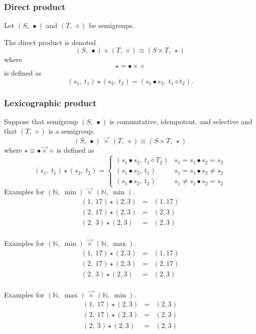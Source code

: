 \documentclass[10pt]{article}
\newcommand{\NN}{\mathbb{N}}
\newcommand{\lexprod}{\ensuremath{\mathbin{\vec{\times}}}}
\begin{document}
\subsubsection{Direct product} 

Let $(S,\ \bullet)$ and $(T,\ \diamond)$ be semigroups.

The {direct product} is denoted 
\[ 
   (S,\ \bullet) \times (T,\ \diamond) \equiv (S \times T,\ \star)
\] 
where 
\[ 
\star = \bullet \times \diamond 
\] 
is defined as 
\[ 
	(s_1,\ t_1) \star (s_2,\ t_2) 
        = 
        (s_1 \bullet s_2,\  t_1 \diamond t_2).
\] 


\subsubsection{Lexicographic product} 

Suppose that semigroup $(S,\ \bullet)$ is commutative, idempotent, and selective 
and that $(T,\ \diamond)$ is a semigroup. 
\[
(S,\ \bullet)\ \lexprod\ (T,\ \diamond) \equiv (S \times T,\ \star)
\]
where $\star \equiv \bullet\lexprod\diamond$ is defined as 
\[
  (s_1,\ t_1) \star (s_2,\ t_2) =
        \begin{cases}
          (s_1 \bullet s_2,\ t_1 \diamond T_2)   & s_1 = s_1 \bullet s_2 = s_2 \\
          (s_1 \bullet s_2,\ t_1)                & s_1 = s_1 \bullet s_2 \neq s_2 \\
          (s_1 \bullet s_2,\ t_2)                & s_1 \neq s_1 \bullet s_2 = s_2 
        \end{cases}
\]
Examples for $(\NN,\ \min)\ \lexprod\ (\NN,\ \min)$. 
\[
\begin{array}{rcl}
(1,\ 17) \star (2, 3) & = & (1, 17) \\ 
(2,\ 17) \star (2, 3) & = & (2, 3) \\ 
(2,\ 3)  \star (2, 3) & = & (2, 3) \\ 
\end{array} 
\] 

Examples for $(\NN,\ \min)\ \lexprod\ (\NN,\ \max)$. 
\[
\begin{array}{rcl}
(1,\ 17) \star (2, 3) & = & (1, 17) \\ 
(2,\ 17) \star (2, 3) & = & (2, 17) \\ 
(2,\ 3)  \star (2, 3) & = & (2, 3) \\ 
\end{array} 
\] 

Examples for $(\NN,\ \max)\ \lexprod\ (\NN,\ \min)$. 
\[
\begin{array}{rcl}
(1,\ 17) \star (2, 3) & = & (2, 3) \\ 
(2,\ 17) \star (2, 3) & = & (2, 3) \\ 
(2,\ 3)  \star (2, 3) & = & (2, 3) \\ 
\end{array} 
\] 
\end{document}
